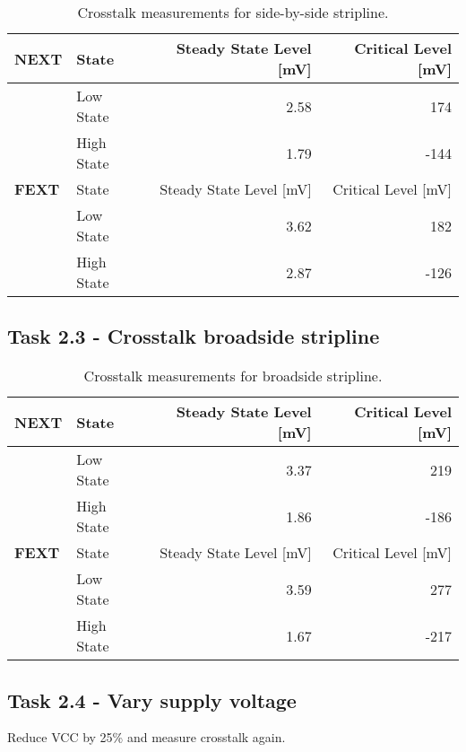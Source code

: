 \documentclass[../main.tex]{subfiles}
\begin{document}
\begin{table}[h]
    \centering
    \begin{tabular}{l l|r r}
        \toprule[1pt]
        \textbf{NEXT} & State & Steady State Level [mV] & Critical Level [mV] \\
        \midrule
        & Low State & 2.58 & 174 \\
        & High State & 1.79 & -144 \\
        \midrule[1pt]
        \textbf{FEXT} & State & Steady State Level [mV] & Critical Level [mV] \\
        \midrule
        & Low State & 3.62 & 182 \\
        & High State & 2.87 & -126 \\
        \bottomrule[1pt]
    \end{tabular}
    \caption{Crosstalk measurements for side-by-side stripline.}
    \label{tab:meas-side-by-side-stripline}
\end{table}

\newpage

\subsection{Task 2.3 - Crosstalk broadside stripline}

\begin{table}[h]
    \centering
    \begin{tabular}{l l|r r}
        \toprule[1pt]
        \textbf{NEXT} & State & Steady State Level [mV] & Critical Level [mV] \\
        \midrule
        & Low State & 3.37 & 219 \\
        & High State & 1.86 & -186 \\
        \midrule[1pt]
        \textbf{FEXT} & State & Steady State Level [mV] & Critical Level [mV] \\
        \midrule
        & Low State & 3.59 & 277 \\
        & High State & 1.67 & -217 \\
        \bottomrule[1pt]
    \end{tabular}
    \caption{Crosstalk measurements for broadside stripline.}
    \label{tab:meas-broadside-stripline}
\end{table}

\subsection{Task 2.4 - Vary supply voltage}

Reduce VCC by 25\% and measure crosstalk again.
\end{document}
